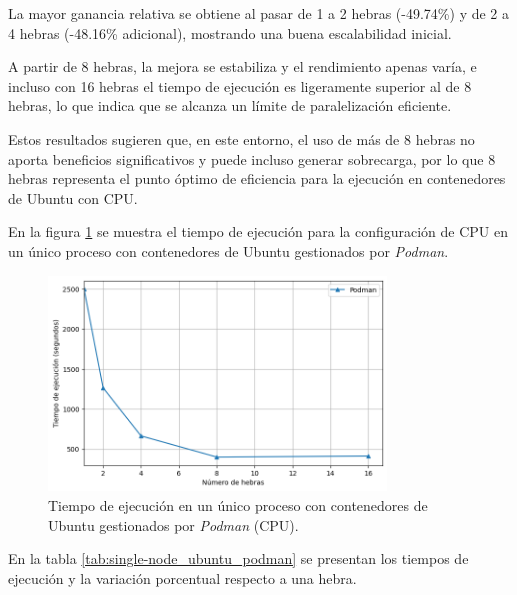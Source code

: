 La mayor ganancia relativa se obtiene al pasar de 1 a 2 hebras (-49.74\%) y de 2 a 4 hebras (-48.16\% adicional), mostrando una buena escalabilidad inicial.

A partir de 8 hebras, la mejora se estabiliza y el rendimiento apenas varía, e incluso con 16 hebras el tiempo de ejecución es ligeramente superior al de 8 hebras, lo que indica que se alcanza un límite de paralelización eficiente.

Estos resultados sugieren que, en este entorno, el uso de más de 8 hebras no aporta beneficios significativos y puede incluso generar sobrecarga, por lo que 8 hebras representa el punto óptimo de eficiencia para la ejecución en contenedores de Ubuntu con CPU.

En la figura \ref{fig:single-node_ubuntu_podman_time} se muestra el tiempo de ejecución para la configuración de CPU en un único proceso con contenedores de Ubuntu gestionados por \textit{Podman}.

\begin{figure}[ht]
    \centering
    \includegraphics[width=0.8\textwidth]{imagenes/cap5/single-node_ubuntu_podman_time.png}
    \caption{Tiempo de ejecución en un único proceso con contenedores de Ubuntu gestionados por \textit{Podman} (CPU).}
    \label{fig:single-node_ubuntu_podman_time}
\end{figure}

En la tabla \ref{tab:single-node_ubuntu_podman} se presentan los tiempos de ejecución y la variación porcentual respecto a una hebra.

